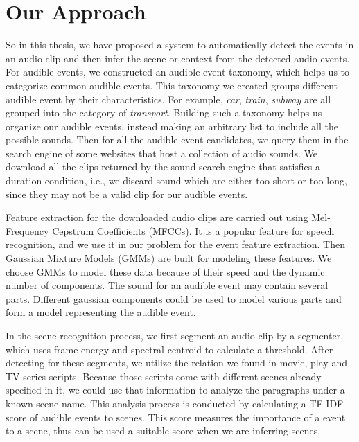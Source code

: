 \section{Our Approach}
So in this thesis, we have proposed a system to automatically detect the events in an audio clip and then infer the scene or context from the detected audio events. 
For audible events, we constructed an audible event taxonomy, which helps us to categorize common audible events. 
This taxonomy we created groups different audible event by their characteristics. 
For example, \textit{car}, \textit{train}, \textit{subway} are all grouped into the category of \textit{transport}. 
Building such a taxonomy helps us organize our audible events, instead making an arbitrary list to include all the possible sounds. 
Then for all the audible event candidates, we query them in the search engine of some websites that host a collection of audio sounds. 
We download all the clips returned by the sound search engine that satisfies a duration condition, i.e., we discard sound which are either too short or too long, since they may not be a valid clip for our audible events.  

Feature extraction for the downloaded audio clips are carried out using Mel-Frequency Cepstrum Coefficients (MFCCs). 
It is a popular feature for speech recognition, and we use it in our problem for the event feature extraction. 
Then Gaussian Mixture Models (GMMs) are built for modeling these features. 
We choose GMMs to model these data because of their speed and the dynamic number of components. 
The sound for an audible event may contain several parts. 
Different gaussian components could be used to model various parts and form a model representing the audible event. 

In the scene recognition process, we first segment an audio clip by a segmenter, which uses frame energy and spectral centroid to calculate a threshold. 
After detecting for these segments, we utilize the relation we found in movie, play and TV series scripts. 
Because those scripts come with different scenes already specified in it, we could use that information to analyze the paragraphs under a known scene name. 
This analysis process is conducted by calculating a TF-IDF score of audible events to scenes. 
This score measures the importance of a event to a scene, thus can be used a suitable score when we are inferring scenes. 

